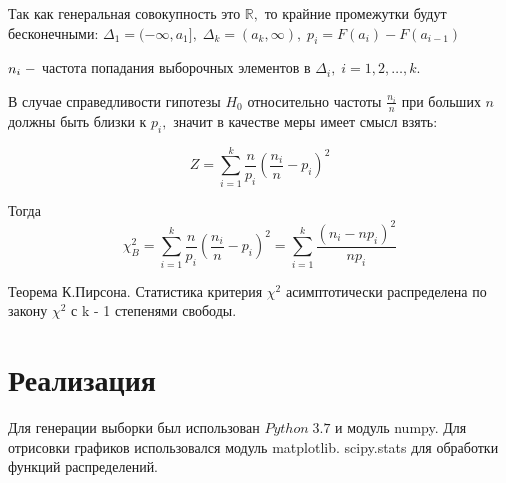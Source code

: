 \documentclass[a4]{article}
\begin{document}
		Так как генеральная совокупность это $\mathbb{R},$ то крайние промежутки будут бесконечными: $\Delta_1=(-\infty,a_1],\;\Delta_k=(a_k,\infty),\;p_i = F(a_i)-F(a_{i-1})$
		
		$n_i\;\--$ частота попадания выборочных элементов в $\Delta_i,\;i=1,2,\ldots,k.$
		
		В случае справедливости гипотезы $H_0$ относительно частоты $\frac{n_i}{n}$ при больших $n$ должны быть близки к $p_i,$ значит в качестве меры имеет смысл взять: 
		
		$$Z = \sum\limits_{i=1}^k\frac{n}{p_i}\left(\frac{n_i}{n}-p_i\right)^2$$
		
		Тогда
		$$\chi^2_B=\sum\limits_{i=1}^k\frac{n}{p_i}\left(\frac{n_i}{n}-p_i\right)^2=\sum\limits_{i=1}^k\frac{(n_i-np_i)^2}{np_i}
		$$
		
		Теорема К.Пирсона. Статистика критерия $\chi^2$ асимптотически распределена по закону $\chi^2$ с k - 1 степенями свободы.
		
	\section{Реализация}
	Для генерации выборки был использован $Python\;3.7$ и модуль numpy. Для отрисовки графиков использовался модуль matplotlib. scipy.stats для обработки функций распределений.
	\newpage
\end{document}

